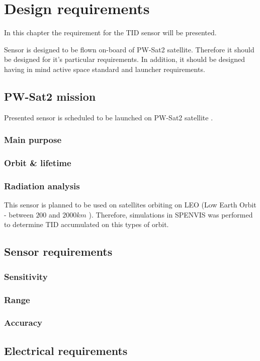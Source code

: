 \chapter{Design requirements}

In this chapter the requirement for the TID sensor will be presented.

Sensor is designed to be flown on-board of PW-Sat2 satellite. Therefore it should be designed for it's particular requirements. In addition, it should be designed having in mind active space standard and launcher requirements.


\section{PW-Sat2 mission}
Presented sensor is scheduled to be launched on PW-Sat2 satellite \cite{PW-Sat2URL}.

\subsection{Main purpose}
\subsection{Orbit \& lifetime}
\subsection{Radiation analysis}
This sensor is planned to be used on satellites orbiting on LEO (Low Earth Orbit - between $200$ and $2000 km$ \cite{ORDEM2000}). Therefore, simulations in SPENVIS was performed to determine TID accumulated on this types of orbit.


\section{Sensor requirements}
\subsection{Sensitivity}
\subsection{Range}
\subsection{Accuracy}

\section{Electrical requirements}
